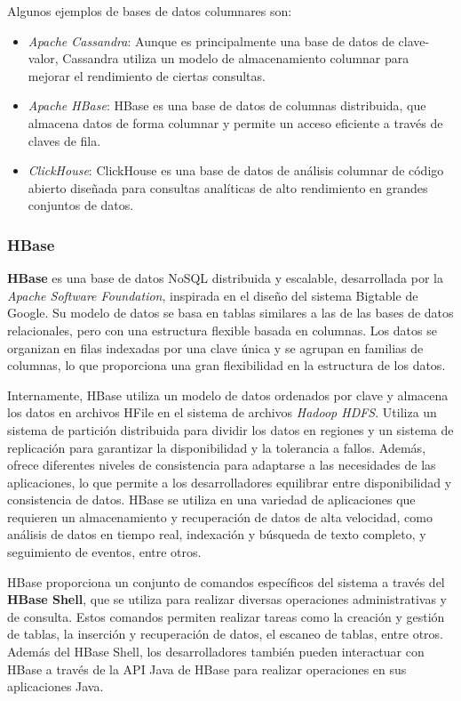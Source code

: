\documentclass[pdflatex,sn-mathphys-num]{sn-jnl}
\theoremstyle{thmstyleone}%
\theoremstyle{thmstyletwo}%
\theoremstyle{thmstylethree}%
\begin{document}
Algunos ejemplos de bases de datos columnares son:
\begin{itemize}
    \item \textit{Apache Cassandra}: Aunque es principalmente una base de datos de clave-valor, Cassandra utiliza un modelo de almacenamiento columnar para mejorar el rendimiento de ciertas consultas.
    \item \textit{Apache HBase}: HBase es una base de datos de columnas distribuida, que almacena datos de forma columnar y permite un acceso eficiente a través de claves de fila.
    \item \textit{ClickHouse}: ClickHouse es una base de datos de análisis columnar de código abierto diseñada para consultas analíticas de alto rendimiento en grandes conjuntos de datos.
\end{itemize}

\subsubsection{HBase}\label{sec421}

\textbf{HBase} \cite{hbase} es una base de datos NoSQL distribuida y escalable, desarrollada por la \textit{Apache Software Foundation}, inspirada en el diseño del sistema Bigtable de Google. Su modelo de datos se basa en tablas similares a las de las bases de datos relacionales, pero con una estructura flexible basada en columnas. Los datos se organizan en filas indexadas por una clave única y se agrupan en familias de columnas, lo que proporciona una gran flexibilidad en la estructura de los datos. 

Internamente, HBase utiliza un modelo de datos ordenados por clave y almacena los datos en archivos HFile en el sistema de archivos \textit{Hadoop HDFS}. Utiliza un sistema de partición distribuida para dividir los datos en regiones y un sistema de replicación para garantizar la disponibilidad y la tolerancia a fallos. Además, ofrece diferentes niveles de consistencia para adaptarse a las necesidades de las aplicaciones, lo que permite a los desarrolladores equilibrar entre disponibilidad y consistencia de datos. HBase se utiliza en una variedad de aplicaciones que requieren un almacenamiento y recuperación de datos de alta velocidad, como análisis de datos en tiempo real, indexación y búsqueda de texto completo, y seguimiento de eventos, entre otros.


HBase proporciona un conjunto de comandos específicos del sistema a través del \textbf{HBase Shell}, que se utiliza para realizar diversas operaciones administrativas y de consulta. Estos comandos permiten realizar tareas como la creación y gestión de tablas, la inserción y recuperación de datos, el escaneo de tablas, entre otros. Además del HBase Shell, los desarrolladores también pueden interactuar con HBase a través de la API Java de HBase para realizar operaciones en sus aplicaciones Java.
\end{document}
